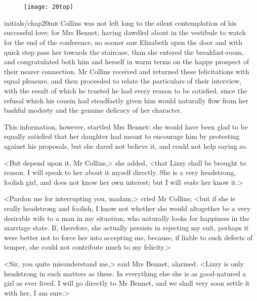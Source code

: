 \chapter[Chapter \thechapter]{}
\begin{figure}[t!]
\centering
\texttt{[image: 20top]}
\end{figure}

\lettrine[lines=6,image=true]{initials/chap20m}{r}  Collins was not left long to the silent contemplation of his successful love; for Mrs Bennet, having dawdled about in the vestibule to watch for the end of the conference, no sooner saw Elizabeth open the door and with quick step pass her towards the staircase, than she entered the breakfast-room, and congratulated both him and herself in warm terms on the happy prospect of their nearer connection. Mr Collins received and returned these felicitations with equal pleasure, and then proceeded to relate the particulars of their interview, with the result of which he trusted he had every reason to be satisfied, since the refusal which his cousin had steadfastly given him would naturally flow from her bashful modesty and the genuine delicacy of her character.

This information, however, startled Mrs Bennet: she would have been glad to be equally satisfied that her daughter had meant to encourage him by protesting against his proposals, but she dared not believe it, and could not help saying so.

<But depend upon it, Mr Collins,> she added, <that Lizzy shall be brought to reason. I will speak to her about it myself directly. She is a very headstrong, foolish girl, and does not know her own interest; but I will \textit{make} her know it.>

<Pardon me for interrupting you, madam,> cried Mr Collins; <but if she is really headstrong and foolish, I know not whether she would altogether be a very desirable wife to a man in my situation, who naturally looks for happiness in the marriage state. If, therefore, she actually persists in rejecting my suit, perhaps it were better not to force her into accepting me, because, if liable to such defects of temper, she could not contribute much to my felicity.>

<Sir, you quite misunderstand me,> said Mrs Bennet, alarmed. <Lizzy is only headstrong in such matters as these. In everything else she is as good-natured a girl as ever lived. I will go directly to Mr Bennet, and we shall very soon settle it with her, I am sure.>


